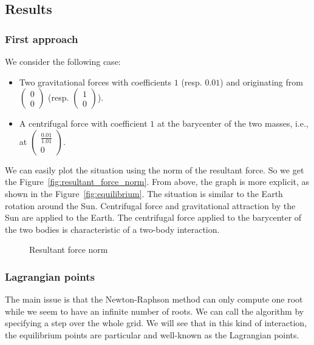 \subsection{Results}
\subsubsection{First approach}
We consider the following case:
\begin{itemize}
  \item Two gravitational forces with coefficients $1$ (resp. $0.01$) and originating from $\begin{pmatrix}0\\0\end{pmatrix}$ (resp. $\begin{pmatrix}1\\0\end{pmatrix}$).
  \item A centrifugal force with coefficient $1$ at the barycenter of the two masses, i.e., at $\begin{pmatrix}\frac{0.01}{1.01}\\0\end{pmatrix}$.
\end{itemize}

We can easily plot the situation using the norm of the resultant force. So we get the Figure~\vref{fig:resultant_force_norm}. From above, the graph is more explicit, as shown in the Figure~\vref{fig:equilibrium}. The situation is similar to the Earth rotation around the Sun. Centrifugal force and gravitational attraction by the Sun are applied to the Earth. The centrifugal force applied to the barycenter of the two bodies is characteristic of a two-body interaction.

\begin{figure}[ht]
\centering 
{}
\caption[Resultant force norm]{Resultant force norm}
\end{figure}

\subsubsection{Lagrangian points}
The main issue is that the Newton-Raphson method can only compute one root while we seem to have an infinite number of roots. We can call the algorithm by specifying a step over the whole grid. We will see that in this kind of interaction, the equilibrium points are particular and well-known as the Lagrangian points.

